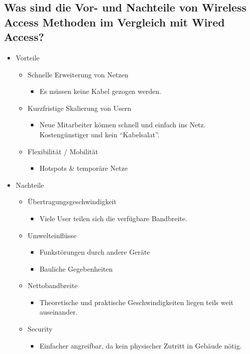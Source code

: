 \subsection*{Was sind die Vor- und Nachteile von \flqq{}Wireless Access\frqq{} Methoden im Vergleich mit \flqq{}Wired Access\frqq?}
\begin{itemize}
    \item Vorteile
    \begin{itemize}
        \item Schnelle Erweiterung von Netzen
        \begin{itemize}
            \item Es müssen keine Kabel gezogen werden.
        \end{itemize}
        \item Kurzfristige Skalierung von Usern
        \begin{itemize}
            \item Neue Mitarbeiter können schnell und einfach ins Netz. Kostengünstiger und kein "`Kabelsalat"'.
        \end{itemize}
        \item Flexibilität / Mobilität
        \begin{itemize}
            \item Hotspots \& temporäre Netze
        \end{itemize}
    \end{itemize}
    \item Nachteile
    \begin{itemize}
        \item Übertragungsgeschwindigkeit
        \begin{itemize}
            \item Viele User teilen sich die verfügbare Bandbreite.
        \end{itemize}
        \item Umwelteinflüsse
        \begin{itemize}
            \item Funkstörungen durch andere Geräte
            \item Bauliche Gegebenheiten
        \end{itemize}
        \item Nettobandbreite
        \begin{itemize}
            \item Theoretische und praktische Geschwindigkeiten liegen teils weit auseinander.
        \end{itemize}
        \item Security
        \begin{itemize}
            \item Einfacher angreifbar, da kein physischer Zutritt in Gebäude nötig.
        \end{itemize}
    \end{itemize}
\end{itemize}